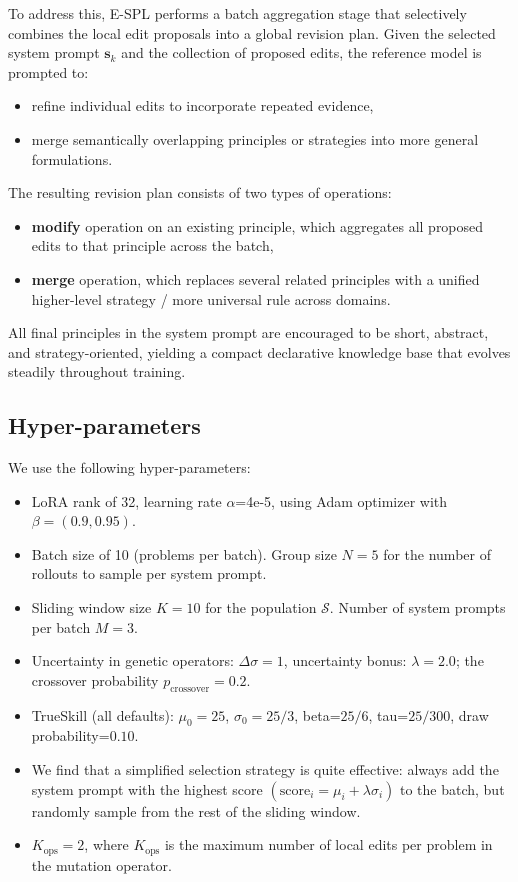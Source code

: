 \documentclass{article}
\theoremstyle{plain}
\theoremstyle{definition}
\theoremstyle{remark}
\begin{document}
To address this, E-SPL performs a batch aggregation stage that selectively combines the local edit proposals into a global revision plan. Given the selected system prompt $\mathbf{s}_{k}$ and the collection of proposed edits, the reference model is prompted to:
\begin{itemize}
    \item refine individual edits to incorporate repeated evidence,
    \item merge semantically overlapping principles or strategies into more general formulations.
\end{itemize}
The resulting revision plan consists of two types of operations:
\begin{itemize}
    \item \textbf{modify} operation on an existing principle, which aggregates all proposed edits to that principle across the batch,
    \item \textbf{merge} operation, which replaces several related principles with a unified higher-level strategy / more universal rule across domains.
\end{itemize}
All final principles in the system prompt are encouraged to be short, abstract, and strategy-oriented, yielding a compact declarative knowledge base that evolves steadily throughout training.

\subsection{Hyper-parameters}
\label{sec:appendix-hyperparameters}

We use the following hyper-parameters:
\begin{itemize}
    \item LoRA \citep{lora} rank of 32, learning rate $\alpha$=4e-5, using Adam optimizer \citep{kingma2014adam} with $\beta=(0.9, 0.95)$.
    \item Batch size of 10 (problems per batch). Group size $N=5$ for the number of rollouts to sample per system prompt.
    \item Sliding window size $K=10$ for the population $\mathcal{S}$.  Number of system prompts per batch $M=3$.
    \item Uncertainty in genetic operators: $\Delta\sigma=1$, uncertainty bonus: $\lambda=2.0$; the crossover probability $p_{\text{crossover}}=0.2$.
    \item TrueSkill (all defaults): $\mu_{0}=25$, $\sigma_0=25/3$, beta=$25/6$, tau=$25/300$, draw probability=$0.10$.
    \item We find that a simplified selection strategy is quite effective: always add the system prompt with the highest score $(\mathrm{score}_{i} = \mu_{i}+\lambda \sigma_{i})$ to the batch, but randomly sample from the rest of the sliding window.
    \item $K_{\text{ops}}=2$, where $K_{\text{ops}}$ is the maximum number of local edits per problem in the mutation operator.
\end{itemize}
\end{document}
